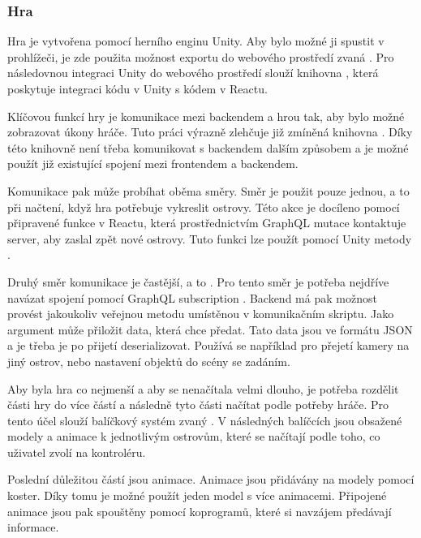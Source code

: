 \subsubsection{Hra}
Hra je vytvořena pomocí herního enginu Unity. Aby bylo možné ji spustit v prohlížeči, je zde použita možnost exportu do webového prostředí zvaná .
Pro následovnou integraci Unity do webového prostředí slouží knihovna \cite{react-unity-webgl}, která poskytuje integraci kódu v Unity s kódem v Reactu.

Klíčovou funkcí hry je komunikace mezi backendem a hrou tak, aby bylo možné zobrazovat úkony hráče. Tuto práci výrazně zlehčuje již zmíněná knihovna \cite{react-unity-webgl}. Díky této knihovně není třeba komunikovat s backendem dalším způsobem a je možné použít již existující spojení mezi frontendem a backendem.\par
Komunikace pak může probíhat oběma směry. Směr  je použit pouze jednou, a to při načtení, když hra potřebuje vykreslit ostrovy. Této akce je docíleno pomocí připravené funkce v Reactu, která prostřednictvím GraphQL mutace  kontaktuje server, aby zaslal zpět nové ostrovy. Tuto funkci lze použít pomocí Unity metody .\par
Druhý směr komunikace je častější, a to . Pro tento směr je potřeba nejdříve navázat spojení pomocí GraphQL subscription . Backend má pak možnost provést jakoukoliv veřejnou metodu umístěnou v komunikačním skriptu. Jako argument může přiložit data, která chce předat. Tato data jsou ve formátu JSON a je třeba je po přijetí deserializovat. Používá se například pro přejetí kamery na jiný ostrov, nebo nastavení objektů do scény se zadáním.

Aby byla hra co nejmenší a aby se nenačítala velmi dlouho, je potřeba rozdělit části hry do více částí a následně tyto části načítat podle potřeby hráče. Pro tento účel slouží balíčkový systém zvaný \cite{AssetBundle}. V následných balíčcích jsou obsažené modely a animace k jednotlivým ostrovům, které se načítají podle toho, co uživatel zvolí na kontroléru.

Poslední důležitou částí jsou animace. Animace jsou přidávány na modely pomocí koster. Díky tomu je možné použít jeden model s více animacemi. Připojené animace jsou pak spouštěny pomocí koprogramů, které si navzájem předávají informace. 
